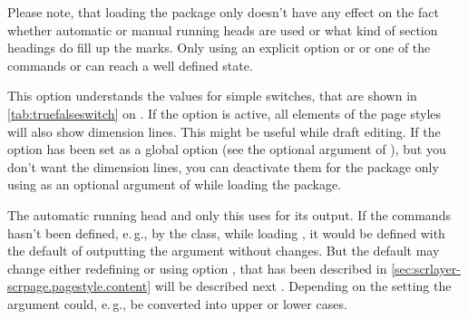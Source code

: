 Please note, that loading the package only doesn't have
any effect on the fact whether automatic or manual running heads are used or
what kind of section headings do fill up the marks. Only using an explicit
option  or  or one of the commands
 or  can reach a well defined state.%
%
%
%
%
%
\fi %

\ifshortversion\IgnoreThistrue{}\fi
\ifIgnoreThis %
\else %

\begin{Declaration}
\end{Declaration}
%
This \KOMAScript{} option understands the values for simple switches, that are
shown in \autoref{tab:truefalseswitch} on . If
the option is active, all elements of the page styles will also show dimension
lines. This might be useful while draft editing. If the option has been set as
a global option (see the optional argument of ), but you
don't want the dimension lines, you can deactivate them for the package only
using  as an optional argument of 
while loading the package.%
%

\begin{Declaration}
\end{Declaration}
%
The automatic running head and only this uses  for its
output. If the commands hasn't been defined, e.\,g., by the class, while
loading , it would be defined with the default of outputting
the argument  without changes. But the default may change either
redefining  or using option , that
\ifshortversion has been described in
  \autoref{sec:scrlayer-scrpage.pagestyle.content}%
\else will be described next%
\fi%
. Depending on the setting the argument could, e.\,g., be converted into upper
or lower cases.
%
%
\fi %

